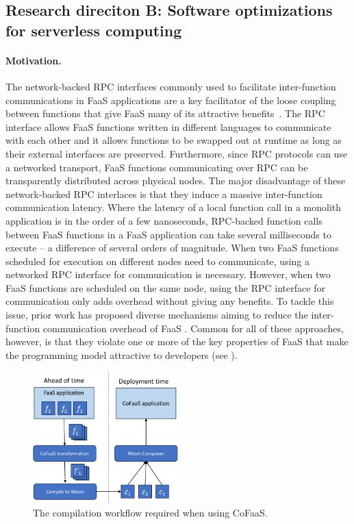 \documentclass[../main.tex]{subfiles}
\begin{document}
\begin{refsection}
\subsection{Research direciton B: Software optimizations for serverless computing}

\paragraph{Motivation.}
The network-backed RPC interfaces commonly used to facilitate
inter-function communications in FaaS applications are a key
facilitator of the loose coupling between functions that give FaaS
many of its attractive
benefits~\cite{gan19_open_sourc_bench_suite_micros}. The RPC
interface allows FaaS functions written in different languages to
communicate with each other and it allows functions to be swapped out
at runtime as long as their external interfaces are
preserved. Furthermore, since RPC protocols can use a networked
transport, FaaS functions communicating over RPC can be transparently
distributed across physical nodes. The major disadvantage of these
network-backed RPC interlaces is that they induce a massive
inter-function communication latency. Where the latency of a local
function call in a monolith application is in the order of a few
nanoseconds, RPC-backed function calls between FaaS functions in a
FaaS application can take several milliseconds to execute -- a
difference of several orders of magnitude. When two FaaS functions
scheduled for execution on different nodes need to communicate, using
a networked RPC interface for communication is necessary. However,
when two FaaS functions are scheduled on the same node, using the RPC
interface for communication only adds overhead without giving any
benefits. To tackle this issue, prior work has proposed diverse
mechanisms aiming to reduce the inter-function communication overhead
of FaaS \cite{kotni21_faast,
  mahgoub22_wisef,barcelona-pons19_faas_track,sreekanti20_cloud,shillaker20_faasm,jia21_night}.
Common for all of these approaches, however, is that they violate one
or more of the key properties of FaaS that make the programming model
attractive to developers (see ).


\begin{figure}[ht]
  \centering
  \includegraphics[width=0.5\textwidth]{papers/paper5-cofaas/figures/cofaas_compilation.pdf}
  \caption{\label{fig:cofaas-comp} The compilation workflow required when using CoFaaS.}
\end{figure}




\end{refsection}
\end{document}
